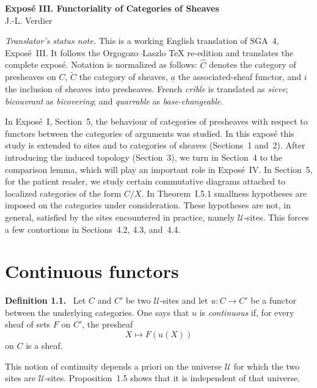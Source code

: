\documentclass[11pt]{article}
\newcommand{\U}{\mathcal{U}}
\newenvironment{statement}[1]{\par\medskip\noindent\textbf{#1.}\ }{\par\medskip}
\begin{document}
\begin{center}
{\Large \textbf{Expos\'e III. Functoriality of Categories of Sheaves}}\\[0.35em]
J.-L. Verdier
\end{center}

\bigskip

\noindent\emph{Translator's status note.} This is a working English translation of SGA~4, Expos\'e~III. It follows the Orgogozo--Laszlo TeX re-edition and translates the complete expos\'e. Notation is normalized as follows: \(\widehat C\) denotes the category of presheaves on \(C\), \(\widetilde C\) the category of sheaves, \(\underline a\) the associated-sheaf functor, and \(i\) the inclusion of sheaves into presheaves. French \emph{crible} is translated as \emph{sieve}; \emph{bicouvrant} as \emph{bicov\-ering}; and \emph{quarrable} as \emph{base-changeable}.

\bigskip

In Expos\'e~I, Section~5, the behaviour of categories of presheaves with respect to functors between the categories of arguments was studied. In this expos\'e this study is extended to sites and to categories of sheaves (Sections~1 and~2). After introducing the induced topology (Section~3), we turn in Section~4 to the comparison lemma, which will play an important role in Expos\'e~IV. In Section~5, for the patient reader, we study certain commutative diagrams attached to localized categories of the form \(C/X\). In Theorem~I.5.1 smallness hypotheses are imposed on the categories under consideration. These hypotheses are not, in general, satisfied by the sites encountered in practice, namely \(\U\)-sites. This forces a few contortions in Sections~4.2, 4.3, and~4.4.

\section{Continuous functors}

\begin{statement}{Definition 1.1}
Let \(C\) and \(C'\) be two \(\U\)-sites and let
\(u:C\to C'\) be a functor between the underlying categories. One says that \(u\) is \emph{continuous} if, for every sheaf of sets \(F\) on \(C'\), the presheaf
\[
X\longmapsto F(u(X))
\]
on \(C\) is a sheaf.
\end{statement}

This notion of continuity depends a priori on the universe \(\U\) for which the two sites are \(\U\)-sites. Proposition~1.5 shows that it is independent of that universe.
\end{document}

